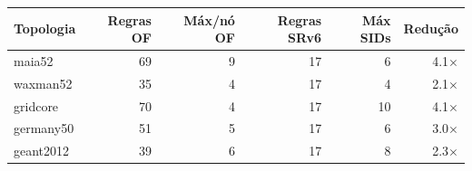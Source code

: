 \begin{tabular}{@{}lrrrrr@{}}
\toprule
Topologia & Regras OF & Máx/nó OF & Regras SRv6 & Máx SIDs & Redução\\
\midrule
maia52 & 69 & 9 & 17 & 6 & 4.1$\times$\\
waxman52 & 35 & 4 & 17 & 4 & 2.1$\times$\\
gridcore & 70 & 4 & 17 & 10 & 4.1$\times$\\
germany50 & 51 & 5 & 17 & 6 & 3.0$\times$\\
geant2012 & 39 & 6 & 17 & 8 & 2.3$\times$\\
\bottomrule
\end{tabular}
